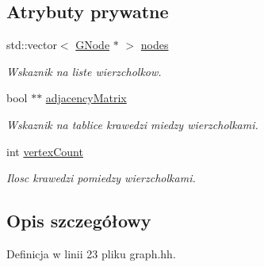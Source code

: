 \subsection*{Atrybuty prywatne}
\begin{DoxyCompactItemize}
\item 
std\-::vector$<$ \hyperlink{struct_g_node}{G\-Node} $\ast$ $>$ \hyperlink{struct_graph_a5850883f2e0f8624184f1918e16ccb7b}{nodes}
\begin{DoxyCompactList}\small\item\em Wskaznik na liste wierzcholkow. \end{DoxyCompactList}\item 
bool $\ast$$\ast$ \hyperlink{struct_graph_a567f812ec20174e2642722ff8bd63b07}{adjacency\-Matrix}
\begin{DoxyCompactList}\small\item\em Wskaznik na tablice krawedzi miedzy wierzcholkami. \end{DoxyCompactList}\item 
int \hyperlink{struct_graph_aa61a470b538b8c5836ae3f3e6a4dc438}{vertex\-Count}
\begin{DoxyCompactList}\small\item\em Ilosc krawedzi pomiedzy wierzcholkami. \end{DoxyCompactList}\end{DoxyCompactItemize}


\subsection{Opis szczegółowy}


Definicja w linii 23 pliku graph.\-hh.



